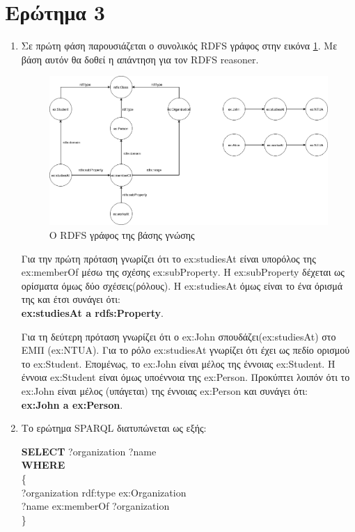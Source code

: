 \documentclass[10pt]{article}
\newcommand{\lat}{\foreignlanguage{english}}
\begin{document}
	\section*{Ερώτημα 3}
	\begin{enumerate}
		\item Σε πρώτη φάση παρουσιάζεται ο συνολικός \lat{RDFS} γράφος στην εικόνα \ref{rdfsgraph}. Με βάση αυτόν θα δοθεί η απάντηση για τον \lat{RDFS reasoner}.
		
		\begin{figure}[H]
		\centering
		\includegraphics[scale=0.4]{question3}
		\caption{\footnotesize{Ο \lat{RDFS} γράφος της βάσης γνώσης}}
		\label{rdfsgraph}
		\end{figure}

		Για την πρώτη πρόταση γνωρίζει ότι το \lat{ex:studiesAt} είναι υπορόλος της \lat{ex:memberOf} μέσω της σχέσης \lat{ex:subProperty}. Η \lat{ex:subProperty} δέχεται ως ορίσματα όμως δύο σχέσεις(ρόλους). Η \lat{ex:studiesAt} όμως είναι το ένα όρισμά της και έτσι συνάγει ότι:\\ \textbf{\lat{ex:studiesAt a rdfs:Property}}.
		
		Για τη δεύτερη πρόταση γνωρίζει ότι ο \lat{ex:John} σπουδάζει(\lat{ex:studiesAt}) στο ΕΜΠ (\lat{ex:NTUA}). Για το ρόλο \lat{ex:studiesAt} γνωρίζει ότι έχει ως πεδίο ορισμού το \lat{ex:Student}. Επομένως, το \lat{ex:John} είναι μέλος της έννοιας \lat{ex:Student}. Η έννοια \lat{ex:Student} είναι όμως υποέννοια της \lat{ex:Person}. Προκύπτει λοιπόν ότι το \lat{ex:John} είναι μέλος (υπάγεται) της έννοιας \lat{ex:Person} και συνάγει ότι:\\ \textbf{\lat{ex:John a ex:Person}}.
	
		\item Το ερώτημα \lat{SPARQL} διατυπώνεται ως εξής:
		
		\begin{listing}
			\lat{\textbf{SELECT} ?organization ?name}\\
			\lat{\textbf{WHERE}}\\
			\{\\
				\lat{?organization rdf:type ex:Organization}\\
				\lat{?name ex:memberOf ?organization}\\
			\}
		\end{listing}
	

\end{enumerate}
\end{document}
